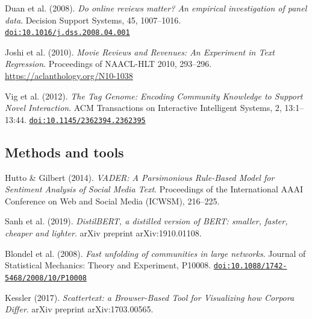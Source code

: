 \begin{enumerate}[label={[\arabic*]},start=21,leftmargin=2.2em,itemsep=2pt]
\item Duan et al. (2008). \textit{Do online reviews matter? An empirical investigation of panel data}. Decision Support Systems, 45, 1007--1016. \href{https://doi.org/10.1016/j.dss.2008.04.001}{\nolinkurl{doi:10.1016/j.dss.2008.04.001}} 
\item Joshi et al. (2010). \textit{Movie Reviews and Revenues: An Experiment in Text Regression}. Proceedings of NAACL-HLT 2010, 293--296. \url{https://aclanthology.org/N10-1038} 
\item Vig et al. (2012). \textit{The Tag Genome: Encoding Community Knowledge to Support Novel Interaction}. ACM Transactions on Interactive Intelligent Systems, 2, 13:1--13:44. \href{https://doi.org/10.1145/2362394.2362395}{\nolinkurl{doi:10.1145/2362394.2362395}} 
\end{enumerate}
\subsection{Methods and tools}
\begin{enumerate}[label={[\arabic*]},start=33,leftmargin=2.2em,itemsep=2pt]
\item Hutto \& Gilbert (2014). \textit{{VADER}: A Parsimonious Rule-Based Model for Sentiment Analysis of Social Media Text}. Proceedings of the International AAAI Conference on Web and Social Media (ICWSM), 216--225. 
\item Sanh et al. (2019). \textit{{DistilBERT}, a distilled version of {BERT}: smaller, faster, cheaper and lighter}. arXiv preprint arXiv:1910.01108. 
\item Blondel et al. (2008). \textit{Fast unfolding of communities in large networks}. Journal of Statistical Mechanics: Theory and Experiment, P10008. \href{https://doi.org/10.1088/1742-5468/2008/10/P10008}{\nolinkurl{doi:10.1088/1742-5468/2008/10/P10008}}
\item Kessler (2017). \textit{Scattertext: a Browser-Based Tool for Visualizing how Corpora Differ}. arXiv preprint arXiv:1703.00565. 
\end{enumerate}
